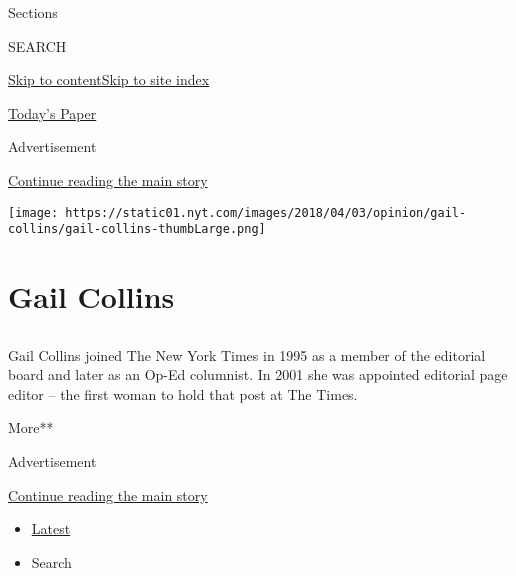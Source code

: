 Sections

SEARCH

\protect\hyperlink{site-content}{Skip to
content}\protect\hyperlink{site-index}{Skip to site index}

\href{https://myaccount.nytimes.com/auth/login?response_type=cookie\&client_id=vi}{}

\href{https://www.nytimes.com/section/todayspaper}{Today's Paper}

Advertisement

\protect\hyperlink{after-top}{Continue reading the main story}

\texttt{[image: https://static01.nyt.com/images/2018/04/03/opinion/gail-collins/gail-collins-thumbLarge.png]}

\hypertarget{gail-collins}{%
\section{Gail Collins}\label{gail-collins}}

\subsection{}

Gail Collins joined The New York Times in 1995 as a member of the
editorial board and later as an Op-Ed columnist. In 2001 she was
appointed editorial page editor -- the first woman to hold that post at
The Times.

More**

Advertisement

\protect\hyperlink{after-mid1}{Continue reading the main story}

\begin{itemize}
\tightlist
\item
  \protect\hyperlink{stream-panel}{Latest}
\item
  Search
\end{itemize}

